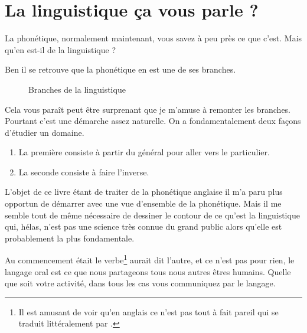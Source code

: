 \chapter{La linguistique ça vous parle ?}\label{chap:linguistic}

La phonétique, normalement maintenant, vous savez à peu près ce que
c'est. Mais qu'en est-il de la linguistique ?

Ben il se retrouve que la phonétique en est une de ses branches.

\begin{center}
    \begin{figure}[h]
      \centering
    \caption{Branches de la linguistique}
    \label{fig:branch-phon}
  \end{figure}
\end{center}
Cela vous paraît peut être surprenant que je m'amuse à remonter les
branches. Pourtant c'est une démarche assez naturelle. On a
fondamentalement deux façons d'étudier un domaine.

\begin{enumerate}
\item La première consiste à partir du général  pour aller vers le
  particulier.
\item La seconde consiste à faire l'inverse.  
\end{enumerate}

 L'objet de ce livre étant de traiter de la phonétique anglaise il m'a
 paru plus opportun de démarrer avec une vue d'ensemble de la
 phonétique. Mais il me semble tout de même nécessaire de dessiner le
 contour de ce qu'est la linguistique qui, hélas, n'est pas une
 science très connue du grand public alors qu'elle est probablement la
 plus fondamentale.

 Au commencement était le verbe\footnote{Il est amusant de voir qu'en
   anglais ce n'est pas tout à fait pareil  qui se traduit littéralement par .} aurait dit l'autre, et ce n'est pas pour
 rien, le langage oral est ce que nous partageons tous nous autres
 êtres humains. Quelle que soit votre activité, dans tous les cas vous
 communiquez par le langage.

